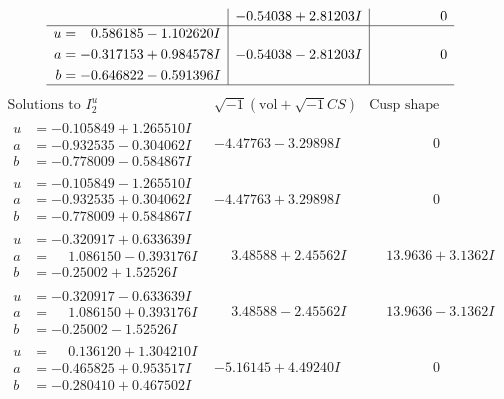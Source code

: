 \documentclass[1p]{elsarticle_modified}
\theoremstyle{definition}
\newcommand{\I}{\sqrt{-1}}
\begin{document}
$$\begin{array}{c|c|c}
 & -0.54038 + 2.81203 I & \phantom{-0.000000 } 0 \\ \hline\begin{aligned}
u &= \phantom{-}0.586185 - 1.102620 I \\
a &= -0.317153 + 0.984578 I \\
b &= -0.646822 - 0.591396 I\end{aligned}
 & -0.54038 - 2.81203 I & \phantom{-0.000000 } 0\\
 \hline 
 \end{array}$$\newpage$$\begin{array}{c|c|c}  
\text{Solutions to }I^u_{2}& \I (\text{vol} + \sqrt{-1}CS) & \text{Cusp shape}\\
 \hline 
\begin{aligned}
u &= -0.105849 + 1.265510 I \\
a &= -0.932535 - 0.304062 I \\
b &= -0.778009 - 0.584867 I\end{aligned}
 & -4.47763 - 3.29898 I & \phantom{-0.000000 } 0 \\ \hline\begin{aligned}
u &= -0.105849 - 1.265510 I \\
a &= -0.932535 + 0.304062 I \\
b &= -0.778009 + 0.584867 I\end{aligned}
 & -4.47763 + 3.29898 I & \phantom{-0.000000 } 0 \\ \hline\begin{aligned}
u &= -0.320917 + 0.633639 I \\
a &= \phantom{-}1.086150 - 0.393176 I \\
b &= -0.25002 + 1.52526 I\end{aligned}
 & \phantom{-}3.48588 + 2.45562 I & \phantom{-}13.9636 + 3.1362 I \\ \hline\begin{aligned}
u &= -0.320917 - 0.633639 I \\
a &= \phantom{-}1.086150 + 0.393176 I \\
b &= -0.25002 - 1.52526 I\end{aligned}
 & \phantom{-}3.48588 - 2.45562 I & \phantom{-}13.9636 - 3.1362 I \\ \hline\begin{aligned}
u &= \phantom{-}0.136120 + 1.304210 I \\
a &= -0.465825 + 0.953517 I \\
b &= -0.280410 + 0.467502 I\end{aligned}
 & -5.16145 + 4.49240 I & \phantom{-0.000000 } 0 \\ \hline\begin{aligned}

\end{aligned}
\end{array}$$
\end{document}
